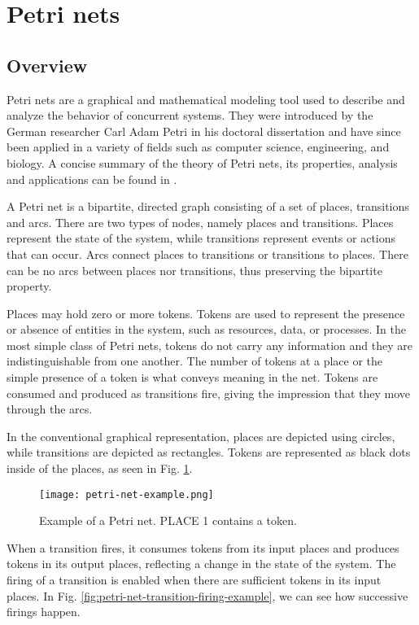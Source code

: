 \documentclass[../Thesis.tex]{subfiles}
\begin{document}
\section{Petri nets}

\subsection{Overview}

Petri nets are a graphical and mathematical modeling tool used to describe and analyze the behavior of concurrent systems.
They were introduced by the German researcher Carl Adam Petri in his doctoral dissertation \cite{petri1962}
and have since been applied in a variety of fields such as computer science, engineering, and biology.
A concise summary of the theory of Petri nets, its properties, analysis and applications can be found in \cite{murata1989}.

A Petri net is a bipartite, directed graph consisting of a set of places, transitions and arcs.
There are two types of nodes, namely places and transitions.
Places represent the state of the system, while transitions represent events or actions that can occur.
Arcs connect places to transitions or transitions to places.
There can be no arcs between places nor transitions, thus preserving the bipartite property.

Places may hold zero or more tokens.
Tokens are used to represent the presence or absence of entities in the system, such as resources, data, or processes.
In the most simple class of Petri nets, tokens do not carry any information and they are indistinguishable from one another.
The number of tokens at a place or the simple presence of a token is what conveys meaning in the net.
Tokens are consumed and produced as transitions fire, giving the impression that they move through the arcs.

In the conventional graphical representation, places are depicted using circles, while transitions are depicted as rectangles.
Tokens are represented as black dots inside of the places, as seen in Fig. \ref{fig:petri-net-example}.

\begin{figure}[H]
    \centering
    \texttt{[image: petri-net-example.png]}
    \caption{Example of a Petri net. \uppercase{PLACE 1} contains a token.}
    \label{fig:petri-net-example}
\end{figure}

When a transition fires, it consumes tokens from its input places and
produces tokens in its output places, reflecting a change in the state of the system.
The firing of a transition is enabled when there are sufficient tokens in its input places.
In Fig. \ref{fig:petri-net-transition-firing-example}, we can see how successive firings happen.
\end{document}
